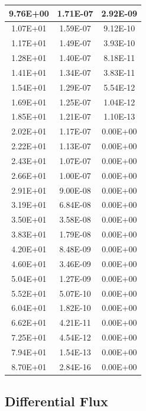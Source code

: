 \documentclass{hitec}
\begin{document}
\begin{table}[h]
{\begin{tabular}{|c|c|c|}
			9.76E+00&	1.71E-07&	2.92E-09\\ \hline
			1.07E+01&	1.59E-07&	9.12E-10\\ \hline
			1.17E+01&	1.49E-07&	3.93E-10\\ \hline
			1.28E+01&	1.40E-07&	8.18E-11\\ \hline
			1.41E+01&	1.34E-07&	3.83E-11\\ \hline
			1.54E+01&	1.29E-07&	5.54E-12\\ \hline
			1.69E+01&	1.25E-07&	1.04E-12\\ \hline
			1.85E+01&	1.21E-07&	1.10E-13\\ \hline
			2.02E+01&	1.17E-07&	0.00E+00\\ \hline
			2.22E+01&	1.13E-07&	0.00E+00\\ \hline
			2.43E+01&	1.07E-07&	0.00E+00\\ \hline
			2.66E+01&	1.00E-07&	0.00E+00\\ \hline
			2.91E+01&	9.00E-08&	0.00E+00\\ \hline
			3.19E+01&	6.84E-08&	0.00E+00\\ \hline
			3.50E+01&	3.58E-08&	0.00E+00\\ \hline
			3.83E+01&	1.79E-08&	0.00E+00\\ \hline
			4.20E+01&	8.48E-09&	0.00E+00\\ \hline
			4.60E+01&	3.46E-09&	0.00E+00\\ \hline
			5.04E+01&	1.27E-09&	0.00E+00\\ \hline
			5.52E+01&	5.07E-10&	0.00E+00\\ \hline
			6.04E+01&	1.82E-10&	0.00E+00\\ \hline
			6.62E+01&	4.21E-11&	0.00E+00\\ \hline
			7.25E+01&	4.54E-12&	0.00E+00\\ \hline
			7.94E+01&	1.54E-13&	0.00E+00\\ \hline
			8.70E+01&	2.84E-16&	0.00E+00\\ \hline	
		\end{tabular}%
	}
\end{table}

\clearpage %



\subsection{Differential Flux}

\end{document}
